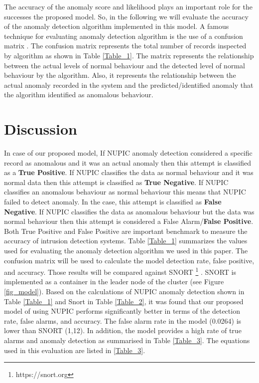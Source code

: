 \documentclass[sigconf]{acmart}
\begin{document}
The accuracy of the anomaly score and likelihood plays an important role for the successes the proposed model. So, in the following we will evaluate the accuracy of the anomaly detection algorithm implemented in this model. A famous technique for evaluating anomaly detection algorithm is the use of a confusion matrix \cite{kohavi1998confusion}. The confusion matrix represents the total number of records inspected by algorithm as shown in Table \ref{Table_1}. The matrix represents the relationship between the actual levels of normal behaviour and the detected level of normal behaviour by the algorithm. Also, it represents the relationship between the actual anomaly recorded in the system and the predicted/identified anomaly that the algorithm identified as anomalous behaviour.   
 \section{Discussion}
\label{sec:disc}

In case of our proposed model, If NUPIC anomaly detection considered a specific record as anomalous and it was an actual anomaly then this attempt is classified as a \textbf{True Positive}. If NUPIC classifies the data as normal behaviour and it was normal data then this attempt is classified as \textbf{True Negative}. If NUPIC classifies an anomalous behaviour as normal behaviour this means that NUPIC failed to detect anomaly. In the case, this attempt is classified as \textbf{False Negative}. If NUPIC classifies the data as anomalous behaviour but the data was normal behaviour then this attempt is considered a False Alarm/\textbf{False Positive}. Both True Positive and False Positive are important benchmark to measure the accuracy of intrusion detection systems. Table \ref{Table_1} summarizes the values used for evaluating the anomaly detection algorithm we used in this paper. The confusion matrix will be used to calculate the model detection rate, false positive, and accuracy. Those results will be compared against SNORT \footnote{https://snort.org} \cite{roesch1999snort}. SNORT is implemented as a container in the leader node of the cluster (see Figure \ref{fig_model}). Based on the calculations of NUPIC anomaly detection shown in Table \ref{Table_1} and Snort in Table \ref{Table_2}, it was found that our proposed model of using NUPIC performs significantly better in terms of the detection rate, false alarms, and accuracy. The false alarm rate in the model (0.0264) is lower than SNORT (1,12). In addition, the model provides a high rate of true alarms and anomaly detection as summarised in Table \ref{Table_3}. The equations used in this evaluation are listed in \ref{Table_3}.    
 
\end{document}
